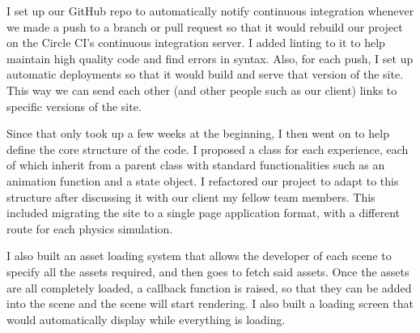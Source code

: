 \documentclass[onecolumn, draftclsnofoot,10pt, compsoc]{IEEEtran}
\begin{document}
I set up our GitHub repo to automatically notify continuous integration whenever we made a push to a branch or pull request so that it would rebuild our project on the Circle CI's continuous integration server. I added linting to it to help maintain high quality code and find errors in syntax. Also, for each push, I set up automatic deployments so that it would build and serve that version of the site. This way we can send each other (and other people such as our client) links to specific versions of the site. 

Since that only took up a few weeks at the beginning, I then went on to help define the core structure of the code. I proposed a class for each experience, each of which inherit from a parent class with standard functionalities such as an animation function and a state object. I refactored our project to adapt to this structure after discussing it with our client my fellow team members. This included migrating the site to a single page application format, with a different route for each physics simulation.

I also built an asset loading system that allows the developer of each scene to specify all the assets required, and then goes to fetch said assets. Once the assets are all completely loaded, a callback function is raised, so that they can be added into the scene and the scene will start rendering. I also built a loading screen that would automatically display while everything is loading. 
\end{document}
